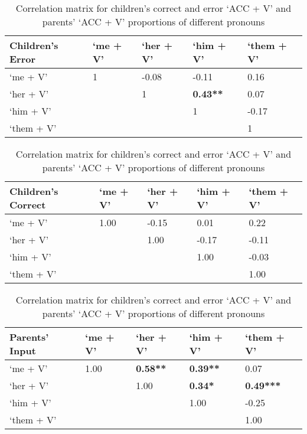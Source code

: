 \FloatBarrier
\begin{table}[!h]
\centering
\caption{Correlation matrix for children's correct and error `ACC + V' and parents' `ACC + V' proportions of different pronouns }
\label{tab: matrices}
\begin{minipage}{0.8\textwidth}
\centering
{}
\begin{tabular}{l|llll}
\toprule
\textbf{Children's Error} & `me + V' & ‘her + V' & ‘him + V’ & ‘them + V’ \\ \hline
`me + V'  & 1 & -0.08 & -0.11 & 0.16 \\
‘her + V’ &  & 1 & \textbf{0.43**} & 0.07 \\
‘him + V’ &  &  & 1 & -0.17 \\
‘them + V’ &  &  &  & 1\\
\bottomrule
\end{tabular}
\end{minipage}
\begin{minipage}{0.95\textwidth}
\centering
{}
\begin{tabular}{l|llll}
\toprule
\textbf{Children's Correct} & `me + V' & ‘her + V’ & ‘him + V’ & ‘them + V’ \\
\hline
`me + V' & 1.00 & -0.15 & 0.01 & 0.22 \\
‘her + V’&  & 1.00 & -0.17 & -0.11 \\
‘him + V’&  &  & 1.00 & -0.03 \\
‘them + V’ &  &  &  & 1.00\\
\bottomrule
\end{tabular}
\end{minipage}
\begin{minipage}{0.8\textwidth}
\centering
{}
\begin{tabular}{l|llll}
\toprule
\textbf{Parents' Input} & `me + V' & ‘her + V’ & ‘him + V’ & ‘them + V’\\
\hline
`me + V'  & 1.00 & \textbf{0.58**} & \textbf{0.39**} & 0.07 \\
 ‘her + V’ &  & 1.00 & \textbf{0.34*} & \textbf{0.49***} \\
 ‘him + V’ &  &  & 1.00 & -0.25 \\
‘them + V’ &  &  &  & 1.00\\
\bottomrule
\end{tabular}

\end{minipage}


\end{table}
\FloatBarrier




